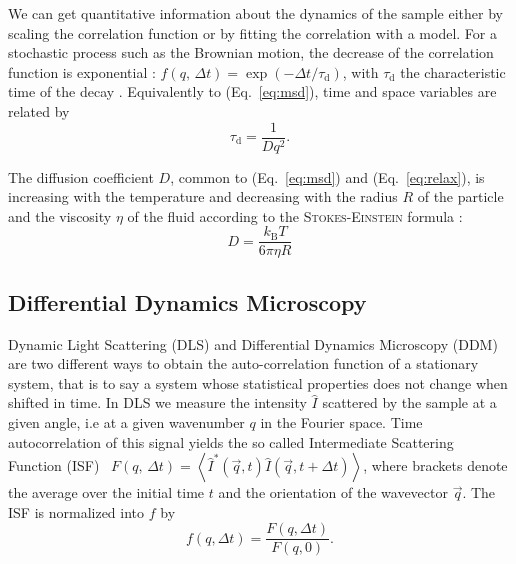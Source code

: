 \documentclass[%
 aip,
 jmp,%
 amsmath,amssymb,
reprint,%
]{revtex4-1}
\begin{document}
We can get quantitative information about the dynamics of the sample either by scaling the correlation function or by fitting the correlation with a model. For a stochastic process such as the Brownian motion, the decrease of the correlation function is exponential : $f(q, \, \Delta t) = \exp(-\Delta t/\tau_\text{d})$, with $\tau_\text{d}$ the characteristic time of the decay \citep{8_berne2000dynamic}. Equivalently to (Eq.~\ref{eq:msd}), time and space variables are related by
\begin{equation}
\tau_\text{d} = \frac{1}{Dq^2}.
\label{eq:relax}
\end{equation}

The diffusion coefficient $D$, common to (Eq.~\ref{eq:msd}) and (Eq.~\ref{eq:relax}), is increasing with the temperature and decreasing with the radius $R$ of the particle and the viscosity $\eta$ of the fluid according to the \textsc{Stokes-Einstein} formula \citep{9_einstein1906theory}:
\begin{equation}
D = \frac{k_\text{B} T}{6 \pi \eta R}
\end{equation}

\subsection{Differential Dynamics Microscopy}
\label{ddm}
Dynamic Light Scattering (DLS) and Differential Dynamics Microscopy (DDM) are two different ways to obtain the auto-correlation function of a stationary system, that is to say a system whose statistical properties does not change when shifted in time. In DLS we measure the intensity $\hat{I}$ scattered by the sample at a given angle, i.e at a given wavenumber $q$ in the Fourier space. Time autocorrelation of this signal yields the so called Intermediate Scattering Function (ISF)~\citep{19_goodman2005introduction} $F(q, \, \Delta t) = \left\langle \hat{I}^*(\vec{q}, t) \hat{I}(\vec{q}, t+\Delta t) \right\rangle$, where brackets denote the average over the initial time $t$ and the orientation of the wavevector $\vec{q}$. The ISF is normalized into $f$ by
\begin{equation}
f(q, \Delta t) = \frac{F(q, \Delta t)}{F(q, 0)}.
\end{equation}
\end{document}
